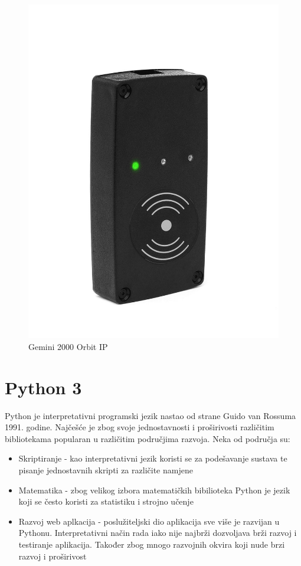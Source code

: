 \documentclass[times, utf8, zavrsni]{fer}
\begin{document}
\begin{figure}[h]
\includegraphics[scale=0.2]{orbit.jpg}
\centering
\caption{Gemini 2000 Orbit IP}
\centering
\end{figure}

\section{Python 3}
Python je interpretativni programski jezik nastao od strane Guido van Rossuma 1991. godine. Najčešće je zbog svoje jednostavnosti i proširivosti različitim bibliotekama popularan u različitim područjima razvoja. Neka od područja su:

\begin{itemize}
\item Skriptiranje - kao interpretativni jezik koristi se za podešavanje sustava te pisanje jednostavnih skripti za različite namjene
\item Matematika - zbog velikog izbora matematičkih bibilioteka Python je jezik koji se često koristi za statistiku i strojno učenje
\item Razvoj web aplkacija - poslužiteljski dio aplikacija sve više je razvijan u Pythonu. Interpretativni način rada iako nije najbrži dozvoljava brži razvoj i testiranje aplikacija. Također zbog mnogo razvojnih okvira koji nude brzi razvoj i proširivost
\end{itemize} 
\end{document}
